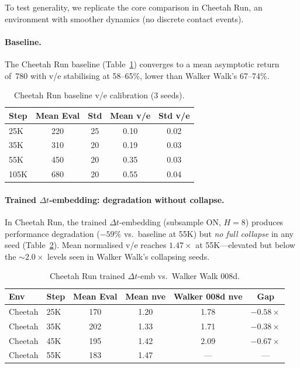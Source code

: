 \documentclass[letterpaper]{article}
\begin{document}
To test generality, we replicate the core comparison in Cheetah Run, an environment with smoother dynamics (no discrete contact events).

\paragraph{Baseline.}
The Cheetah Run baseline (Table~\ref{tab:cheetah-baseline}) converges to a mean asymptotic return of~780 with v/e stabilising at 58--65\%, lower than Walker Walk's 67--74\%.

\begin{table}[h]
\centering
\caption{Cheetah Run baseline v/e calibration (3 seeds).}
\label{tab:cheetah-baseline}
\begin{tabular}{lcccc}
\toprule
Step & Mean Eval & Std & Mean v/e & Std v/e \\
\midrule
25K  & 220 & 25 & 0.10 & 0.02 \\
35K  & 310 & 20 & 0.19 & 0.03 \\
55K  & 450 & 20 & 0.35 & 0.03 \\
105K & 680 & 20 & 0.55 & 0.04 \\
\bottomrule
\end{tabular}
\end{table}

\paragraph{Trained $\Delta t$-embedding: degradation without collapse.}
In Cheetah Run, the trained $\Delta t$-embedding (subsample ON, $H{=}8$) produces performance degradation ($-59\%$ vs.\ baseline at 55K) but \emph{no full collapse} in any seed (Table~\ref{tab:cheetah-trained}).
Mean normalised v/e reaches $1.47\times$ at 55K---elevated but below the ${\sim}2.0\times$ levels seen in Walker Walk's collapsing seeds.

\begin{table}[h]
\centering
\caption{Cheetah Run trained $\Delta t$-emb vs.\ Walker Walk 008d.}
\label{tab:cheetah-trained}
\begin{tabular}{llcccc}
\toprule
Env & Step & Mean Eval & Mean nve & Walker 008d nve & Gap \\
\midrule
Cheetah & 25K & 170 & 1.20 & 1.78 & $-0.58\times$ \\
Cheetah & 35K & 202 & 1.33 & 1.71 & $-0.38\times$ \\
Cheetah & 45K & 195 & 1.42 & 2.09 & $-0.67\times$ \\
Cheetah & 55K & 183 & 1.47 & --- & --- \\
\bottomrule
\end{tabular}
\end{table}
\end{document}
